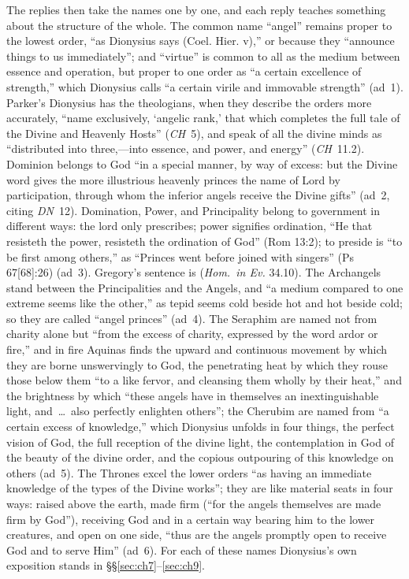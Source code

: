 The replies then take the names one by one, and each reply teaches
something about the structure of the whole. The common name ``angel'' remains
proper to the lowest order, ``as Dionysius says (Coel. Hier. v),'' or because
they ``announce things to us immediately''; and ``virtue'' is common to all
as the medium between essence and operation, but proper to one order as ``a
certain excellence of strength,'' which Dionysius calls ``a certain virile
and immovable strength'' (ad~1). Parker's Dionysius has the theologians, when
they describe the orders more accurately, ``name exclusively, `angelic rank,'
that which completes the full tale of the Divine and Heavenly Hosts''
(\emph{CH}~5), and speak of all the divine minds as ``distributed into
three,---into essence, and power, and energy'' (\emph{CH}~11.2). Dominion
belongs to God ``in a special manner, by way of excess: but the Divine word
gives the more illustrious heavenly princes the name of Lord by
participation, through whom the inferior angels receive the Divine gifts''
(ad~2, citing \emph{DN}~12). Domination, Power, and Principality belong to
government in different ways: the lord only prescribes; power signifies
ordination, ``He that resisteth the power, resisteth the ordination of God''
(Rom 13:2); to preside is ``to be first among others,'' as ``Princes went
before joined with singers'' (Ps 67[68]:26) (ad~3). Gregory's sentence is
 (\emph{Hom.\ in Ev.} 34.10). The
Archangels stand between the Principalities and the Angels, and ``a medium
compared to one extreme seems like the other,'' as tepid seems cold beside
hot and hot beside cold; so they are called ``angel princes'' (ad~4). The
Seraphim are named not from charity alone but ``from the excess of charity,
expressed by the word ardor or fire,'' and in fire Aquinas finds the upward
and continuous movement by which they are borne unswervingly to God, the
penetrating heat by which they rouse those below them ``to a like fervor,
and cleansing them wholly by their heat,'' and the brightness by which ``these
angels have in themselves an inextinguishable light, and~\dots\ also
perfectly enlighten others''; the Cherubim are named from ``a certain excess
of knowledge,'' which Dionysius unfolds in four things, the perfect vision of
God, the full reception of the divine light, the contemplation in God of the
beauty of the divine order, and the copious outpouring of this knowledge on
others (ad~5). The Thrones excel the lower orders ``as having an immediate
knowledge of the types of the Divine works''; they are like material seats
in four ways: raised above the earth, made firm (``for the angels themselves
are made firm by God''), receiving God and in a certain way bearing him to
the lower creatures, and open on one side, ``thus are the angels promptly
open to receive God and to serve Him'' (ad~6). For each of these names
Dionysius's own exposition stands in \S\S\ref{sec:ch7}--\ref{sec:ch9}.

